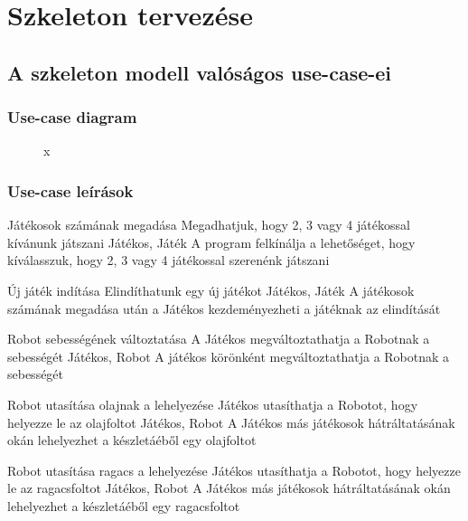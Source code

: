 %
\chapter{Szkeleton tervezése}

\thispagestyle{fancy}

\section{A szkeleton modell valóságos use-case-ei}

\subsection{Use-case diagram}

\begin{figure}[h]
\begin{center}
\caption{x}
\label{fig:SzkeletonUseCase}
\end{center}
\end{figure}

\subsection{Use-case leírások}

\usecase%
{Játékosok számának megadása}%
{Megadhatjuk, hogy 2, 3 vagy 4 játékossal kívánunk játszani}%
{Játékos, Játék}%
{A program felkínálja a lehetőséget, hogy kíválasszuk, hogy 2, 3 vagy 4 játékossal szerenénk játszani}

\usecase%
{Új játék indítása}%
{Elindíthatunk egy új játékot}%
{Játékos, Játék}%
{A játékosok számának megadása után a Játékos kezdeményezheti a játéknak az elindítását}

\usecase%
{Robot sebességének változtatása}%
{A Játékos megváltoztathatja a Robotnak a sebességét}%
{Játékos, Robot}%
{A játékos körönként megváltoztathatja a Robotnak a sebességét}

\usecase%
{Robot utasítása olajnak a lehelyezése}%
{Játékos utasíthatja a Robotot, hogy helyezze le az olajfoltot}%
{Játékos, Robot}%
{A Játékos más játékosok hátráltatásának okán lehelyezhet a készletáéből egy olajfoltot}

\usecase%
{Robot utasítása ragacs a lehelyezése}%
{Játékos utasíthatja a Robotot, hogy helyezze le az ragacsfoltot}%
{Játékos, Robot}%
{A Játékos más játékosok hátráltatásának okán lehelyezhet a készletáéből egy ragacsfoltot}

